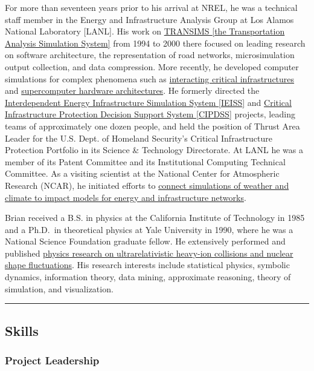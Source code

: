 \documentclass[]{article}
\begin{document}
For more than seventeen years prior to his arrival at NREL, he was a
technical staff member in the Energy and Infrastructure Analysis Group
at Los Alamos National Laboratory {[}LANL{]}. His work on
\href{projects/transims.html}{TRANSIMS {[}the Transportation Analysis
Simulation System{]}} from 1994 to 2000 there focused on leading
research on software architecture, the representation of road networks,
microsimulation output collection, and data compression. More recently,
he developed computer simulations for complex phenomena such as
\href{projects/infrastructure.html}{interacting critical
infrastructures} and \href{projects/a-la-carte.html}{supercomputer
hardware architectures}. He formerly directed the
\href{projects/ieiss.html}{Interdependent Energy Infrastructure
Simulation System {[}IEISS{]}} and \href{projects/cipdss.html}{Critical
Infrastructure Protection Decision Support System {[}CIPDSS{]}}
projects, leading teams of approximately one dozen people, and held the
position of Thrust Area Leader for the U.S. Dept. of Homeland Security's
Critical Infrastructure Protection Portfolio in its Science \&
Technology Directorate. At LANL he was a member of its Patent Committee
and its Institutional Computing Technical Committee. As a visiting
scientist at the National Center for Atmospheric Research (NCAR), he
initiated efforts to \href{projects/weather-impacts.html}{connect
simulations of weather and climate to impact models for energy and
infrastructure networks}.

Brian received a B.S. in physics at the California Institute of
Technology in 1985 and a Ph.D.~in theoretical physics at Yale University
in 1990, where he was a National Science Foundation graduate fellow. He
extensively performed and published \href{projects/physics.html}{physics
research on ultrarelativistic heavy-ion collisions and nuclear shape
fluctuations}. His research interests include statistical physics,
symbolic dynamics, information theory, data mining, approximate
reasoning, theory of simulation, and visualization.

\begin{center}\rule{3in}{0.4pt}\end{center}

\subsection{Skills}\label{skills}

\subsubsection{Project Leadership}\label{project-leadership}
\end{document}
